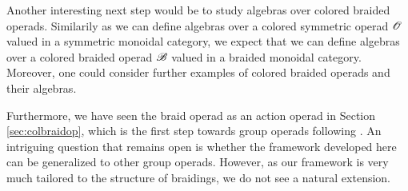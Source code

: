 \medskip

Another interesting next step would be to study algebras over colored braided
operads. Similarily as we can define algebras over a colored symmetric operad
$\mathscr{O}$ valued in a symmetric monoidal category, we expect that we can define
algebras over a colored braided operad $\mathscr{B}$ valued in a braided monoidal
category. Moreover, one could consider further examples of colored braided
operads and their algebras.


Furthermore, we have seen the braid operad as an action operad in Section
\ref{sec:colbraidop}, which is the first step towards group operads following
\cite{yau}. An intriguing question that remains open is whether the framework
developed here can be generalized to other group operads. However, as our
framework is very much tailored to the structure of braidings, we do not see a
natural extension.